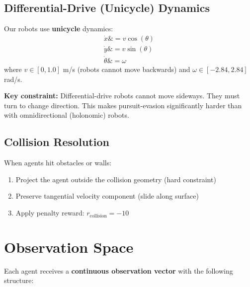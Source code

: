 \documentclass[11pt,a4paper]{report}
\begin{document}
\subsection{Differential-Drive (Unicycle) Dynamics}
Our robots use \textbf{unicycle} dynamics:
\begin{align}
    \dot{x} \&= v \cos(\theta) \\
    \dot{y} \&= v \sin(\theta) \\
    \dot{\theta} \&= \omega
\end{align}
where $v \in [0, 1.0]$ m/s (robots cannot move backwards) and $\omega \in [-2.84, 2.84]$ rad/s.

\begin{infobox}
\textbf{Key constraint:} Differential-drive robots cannot move sideways. They must turn to change direction. This makes pursuit-evasion significantly harder than with omnidirectional (holonomic) robots.
\end{infobox}

\subsection{Collision Resolution}
When agents hit obstacles or walls:
\begin{enumerate}
    \item Project the agent outside the collision geometry (hard constraint)
    \item Preserve tangential velocity component (slide along surface)
    \item Apply penalty reward: $r_{\text{collision}} = -10$
\end{enumerate}

\section{Observation Space}

Each agent receives a \textbf{continuous observation vector} with the following structure:
\end{document}

